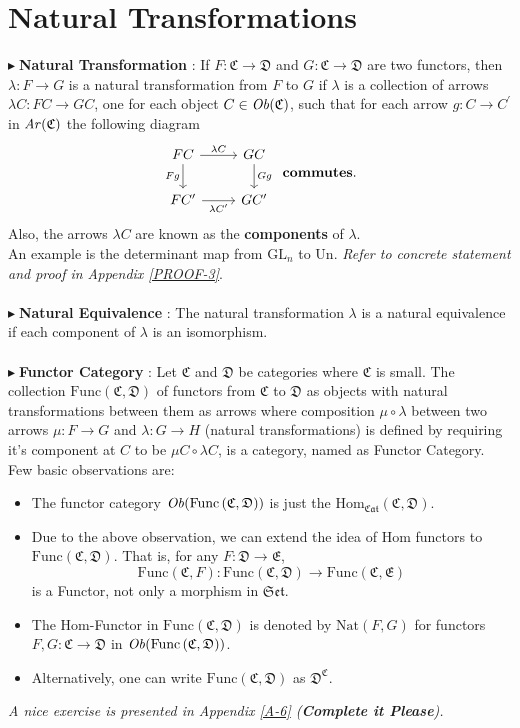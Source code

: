 \documentclass{article}
\theoremstyle{definition}
\theoremstyle{remark}
\theoremstyle{definition}
\theoremstyle{definition}
\theoremstyle{definition}
\newcommand{\cat}[1]{\mathfrak{#1}}
\newcommand{\obj}[1]{\text{\textit{Ob}}(#1)}
\newcommand{\arr}[1]{\text{\textit{Ar}}(#1)}
\newcommand{\homset}[3]{\text{Hom}_{#1}(#2,#3)}
\newcommand{\point}[0]{$\blacktriangleright\;$}
\newcommand{\Func}[2]{\text{Func}\left (#1,#2\right )}
\newcommand{\Nat}[2]{\text{Nat}\left (#1,#2\right )}
\newcommand{\func}[2]{{#2}^{#1}}
\begin{document}
\section{Natural Transformations}
\point \textbf{Natural Transformation} : If $ F : \cat{C} \to \cat{D} $ and $ G : \cat{C} \to \cat{D} $ are two functors, then $ \lambda : F \longrightarrow G $ is a natural transformation from $ F $ to $ G $ if $ \lambda $ is a collection of arrows $ \lambda C : FC \longrightarrow  GC $, one for each object $ C \in \obj{\cat{C}} $, such that for each arrow $ g : C\longrightarrow C^{\prime} $ in $ \arr{\cat{C}} $ the following diagram
\[\begin{tikzcd}
	FC \arrow[swap]{d}{Fg} \arrow{r}{\lambda C} &GC\arrow{d}{Gg}\\
	FC^{\prime} \arrow[swap]{r}{\lambda C^{\prime}} &GC^{\prime} 
\end{tikzcd}\;\;\text{\textbf{commutes}.}\]
Also, the arrows $ \lambda C $ are known as the \textbf{components} of $ \lambda $.\\
An example is the determinant map from $ \text{GL}_n $ to $ \text{Un} $. \emph{Refer to concrete statement and proof in Appendix \ref{PROOF-3}}.\\\\
\point \textbf{Natural Equivalence} : The natural transformation $ \lambda $ is a natural equivalence if each component of $ \lambda $ is an isomorphism.\\\\
\point \textbf{Functor Category} : Let $ \cat{C} $ and $ \cat{D} $ be categories where $ \cat{C} $ is small. The collection $ \Func{\cat{C}}{\cat{D}} $ of functors from $ \cat{C} $ to $ \cat{D} $ as objects with natural transformations between them as arrows where composition $ \mu\circ \lambda $ between two arrows $ \mu: F\to G $ and $ \lambda : G\to H $ (natural transformations) is defined by requiring it's component at $ C $ to be $ \mu C \circ \lambda C $, is a category, named as Functor Category.\\ 
Few basic observations are:
\begin{itemize}
	\item {The functor category $ \obj{\Func{\cat{C}}{\cat{D}} }$ is just the $ \homset{\cat{Cat}}{\cat{C}}{\cat{D}} $.}
	\item {Due to the above observation, we can extend the idea of Hom functors to $ \Func{\cat{C}}{\cat{D}} $. That is, for any $ F : \cat{D} \to \cat{E} $, 
\[\Func{\cat{C}}{F} : \Func{\cat{C}}{\cat{D}} \longrightarrow \Func{\cat{C}}{\cat{E}}\]
is a Functor, not only a morphism in $ \cat{Set} $.	
}
\item {The Hom-Functor in $ \Func{\cat{C}}{\cat{D}} $ is denoted by $ \Nat{F}{G} $ for functors $ F,G : \cat{C} \to \cat{D}$ in $ \obj{\Func{\cat{C}}{\cat{D}}} $.}
\item {Alternatively, one can write $ \Func{\cat{C}}{\cat{D}} $ as $ \func{\cat{C}}{\cat{D}} $.}
\end{itemize}
\emph{A nice exercise is presented in Appendix \ref{A-6} (\textbf{Complete it Please}).}
\end{document}
